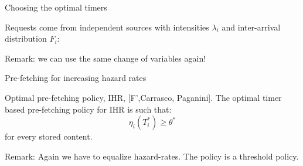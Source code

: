 \documentclass[aspectratio=169]{beamer}
\begin{document}
		

\begin{frame}{Choosing the optimal timers}

	Requests come from independent sources with intensities $\lambda_i$ and inter-arrival distribution $F_i$:

	\vfill

	\vfill
	\pause
	\alert{Remark:} we can use the same change of variables again!
\end{frame}

\begin{frame}{Pre-fetching for increasing hazard rates}

	\begin{block}{Optimal pre-fetching policy, IHR, [F',Carrasco, Paganini].}
		The optimal timer based pre-fetching policy for IHR is such that:
	   \begin{equation*}
		\eta_i (T_i^*) \geqslant \theta^*
	   \end{equation*}
	  for every stored content.
	   \end{block}
	  \vfill
	
	
	  \alert{Remark:} Again we have to equalize hazard-rates. The policy is a threshold policy.

\end{frame}
\end{document}
